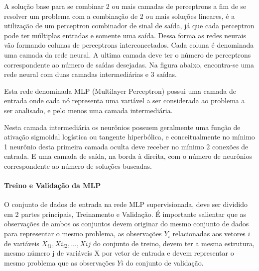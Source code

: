 \documentclass[	12pt, Times, openright, twoside, a4paper, english, brazil]{abntex2}
\begin{document}
  	       A solução base para se combinar 2 ou mais camadas de perceptrons a fim de se resolver um problema com a combinação de 2 ou mais soluções lineares, é a utilização de um perceptron combinador de sinal de saída, já que cada perceptron pode ter múltiplas entradas e somente uma saída. Dessa forma as redes neurais vão formando colunas de perceptrons interconectados. Cada coluna é denominada uma camada da rede neural. A ultima camada deve ter o número de perceptrons correspondente ao número de saídas desejadas. Na figura abaixo, encontra-se uma rede neural com duas camadas intermediárias e 3 saídas.
  	       
  	       \begin{figure}[H]
  	       \end{figure}
         
  	       Esta rede denominada MLP (Multilayer Perceptron) possui uma camada de entrada onde cada nó representa uma variável a ser considerada ao problema a ser analisado, e pelo menos uma camada intermediária.
  	      
  	       Nesta camada intermediária os neurônios possuem geralmente uma função de ativação sigmoidal logística ou tangente hiperbólica, e conceitualmente no mínimo 1 neurônio desta primeira camada oculta deve receber no mínimo 2 conexões de entrada. E uma camada de saída, na borda à direita, com o número de neurônios correspondente ao número de soluções buscadas. 
  	       
            \paragraph*{Treino e Validação da MLP}
            	O conjunto de dados de entrada na rede MLP supervisionada, deve ser dividido em 2 partes principais, Treinamento e Validação. É importante salientar que as observações de ambos os conjuntos devem originar do mesmo conjunto de dados para representar o mesmo problema, as observações $Y_i$ relacionadas aos vetores $i$ de variáveis $X_{i1},Xi_{i2},...,X{ij}$ do conjunto de treino, devem ter a mesma estrutura, mesmo número j de variáveis X por vetor de entrada e devem representar o mesmo problema que as observações $Yi$ do conjunto de validação.
            	
\end{document}
